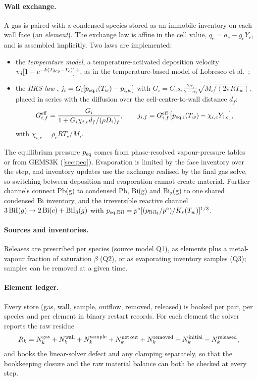 \documentclass[11pt,a4paper]{article}
\begin{document}
\paragraph{Wall exchange.} A gas is paired with a condensed species
stored as an immobile inventory on each wall face (an \emph{element}).
The exchange law is affine in the cell value, $q_e=a_e-g_eY_c$, and is
assembled implicitly. Two laws are implemented:
\begin{itemize}
\item the \emph{temperature model}, a temperature-activated deposition
  velocity $v_d[1-e^{-k(T_{\rm dep}-T_e)}]^+$, as in the
  temperature-based model of Lobresco et al.\
  \cite{Lobresco2026assessment};
\item the \emph{HKS law} \cite{Hertz1882verdunstung,Knudsen1915maximale,
  Schrage1953theoretical}, $j_i=G_i[p_{{\rm eq},i}(T_w)-p_{i,w}]$ with
  $G_i=C_es_i\,\tfrac{2\alpha_i}{2-\alpha_i}\sqrt{M_i/(2\pi RT_w)}$,
  placed in series with the diffusion over the cell-centre-to-wall
  distance $d_f$:
  \begin{equation}
   G_{i,f}^{\rm eff}=\frac{G_i}{1+G_i\chi_{i,c}d_f/(\rho D_i)_f},
   \qquad j_{i,f}=G_{i,f}^{\rm eff}
   \bigl[p_{{\rm eq},i}(T_w)-\chi_{i,c}Y_{i,c}\bigr],
   \label{eq:halfcell}
  \end{equation}
  with $\chi_{i,c}=\rho_cRT_c/M_i$.
\end{itemize}
The equilibrium pressure $p_{\rm eq}$ comes from phase-resolved
vapour-pressure tables or from GEMS3K (\cref{sec:peq}). Evaporation is
limited by the face inventory over the step, and inventory updates use
the exchange realised by the final gas solve, so switching between
deposition and evaporation cannot create material. Further channels
connect Pb(g) to condensed Pb, Bi(g) and Bi$_2$(g) to one shared
condensed Bi inventory, and the irreversible reactive channel
$3\,\ce{BiI}(g)\rightarrow2\,\ce{Bi}(c)+\ce{BiI3}(g)$ with
$p_{{\rm eq,BiI}}=p^\circ[(p_{\rm BiI_3}/p^\circ)/K_r(T_w)]^{1/3}$.

\paragraph{Sources and inventories.} Releases are prescribed per
species (source model Q1), as elements plus a metal-vapour fraction of
saturation $\beta$ (Q2), or as evaporating inventory samples (Q3);
samples can be removed at a given time.

\paragraph{Element ledger.} Every store (gas, wall, sample, outflow,
removed, released) is booked per pair, per species and per element in
binary restart records. For each element the solver reports the raw
residue
\begin{equation}
 R_k=N_k^{\rm gas}+N_k^{\rm wall}+N_k^{\rm sample}+N_k^{\rm net\,out}
     +N_k^{\rm removed}-N_k^{\rm initial}-N_k^{\rm released},
 \label{eq:balance}
\end{equation}
and books the linear-solver defect and any clamping separately, so that
the bookkeeping closure and the raw material balance can both be
checked at every step.
\end{document}
